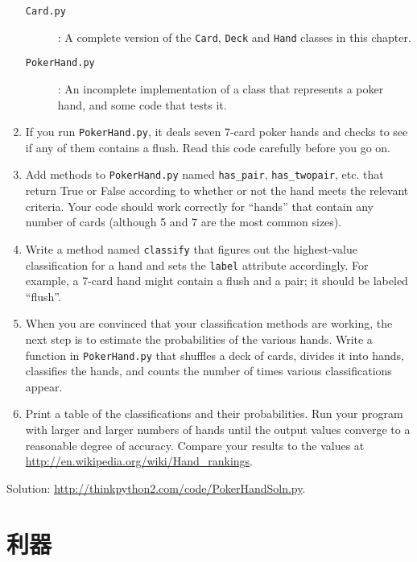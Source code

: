 \documentclass[10pt]{book}
\begin{document}
\begin{exercise}
\begin{enumerate}
\begin{description}
\item[{\tt Card.py}]: A complete version of the {\tt Card},
{\tt Deck} and {\tt Hand} classes in this chapter.

\item[{\tt PokerHand.py}]: An incomplete implementation of a class
that represents a poker hand, and some code that tests it.

\end{description}
%
\item If you run {\tt PokerHand.py}, it deals seven 7-card poker hands
and checks to see if any of them contains a flush.  Read this
code carefully before you go on.

\item Add methods to {\tt PokerHand.py} named \verb"has_pair",
\verb"has_twopair", etc. that return True or False according to
whether or not the hand meets the relevant criteria.  Your code should
work correctly for ``hands'' that contain any number of cards
(although 5 and 7 are the most common sizes).

\item Write a method named {\tt classify} that figures out
the highest-value classification for a hand and sets the
{\tt label} attribute accordingly.  For example, a 7-card hand
might contain a flush and a pair; it should be labeled ``flush''.

\item When you are convinced that your classification methods are
working, the next step is to estimate the probabilities of the various
hands.  Write a function in {\tt PokerHand.py} that shuffles a deck of
cards, divides it into hands, classifies the hands, and counts the
number of times various classifications appear.

\item Print a table of the classifications and their probabilities.
Run your program with larger and larger numbers of hands until the
output values converge to a reasonable degree of accuracy.  Compare
your results to the values at \url{http://en.wikipedia.org/wiki/Hand_rankings}.

\end{enumerate}

Solution: \url{http://thinkpython2.com/code/PokerHandSoln.py}.
\end{exercise}


\chapter{利器}
\end{document}
